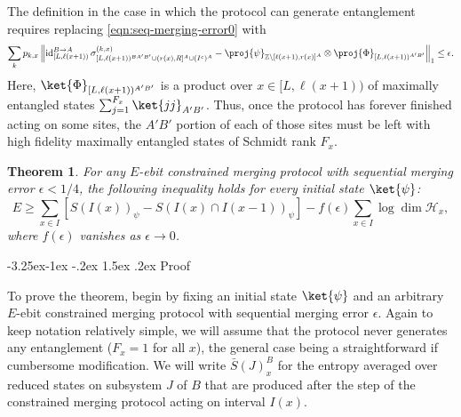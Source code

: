 \documentclass[12pt]{article}
\makeatletter
\newtheorem{theorem}{Theorem}[section]
\renewcommand\subsection{\@startsection{subsection}{2}{\z@}%
                                     {-3.25ex\@plus -1ex \@minus -.2ex}%
                                     {1.5ex \@plus .2ex}%
                                     {\normalfont\bfseries}}
\makeatother
\begin{document}
The definition in the case in which the protocol can generate entanglement requires replacing \eqref{eqn:seq-merging-error0} with
\begin{equation} \label{eqn:seq-merging-error}
\sum_k p_{k,x} \left\|
 \operatorname{id}_{[L,\ell(x+1))}^{B \rightarrow A} \sigma^{(k,x)}_{[L,\ell(x+1))^{BA'B'} \cup (r(x),R]^A \cup (I^c)^A } -  \proj{\psi}_{\mathbb{Z} \setminus [\ell(x+1),r(x)]^A}
 					\otimes \proj{\Phi}_{[L,\ell(x+1))^{A'B'}}
\right\|_1 \leq \epsilon.
\end{equation}
Here, $\ket{\Phi}_{[L,\ell(x+1))^{A'B'}}$ is a product over $x \in [L,\ell(x+1))$ of maximally entangled states $\sum_{j=1}^{F_x} \ket{jj}_{A'B'}$. Thus, once the protocol has forever finished acting on some sites, the $A'B'$ portion of each of those sites must be left with high fidelity maximally entangled states of Schmidt rank $F_x$.
\begin{theorem}
For any $E$-ebit constrained merging protocol with sequential merging error $\epsilon < 1/4$, the following inequality holds for every initial state $\ket{\psi}$:
\begin{equation}
E \geq \sum_{x \in I} \left[ S\left( I(x) \right)_\psi - S\left( I(x) \cap I(x-1) \right)_\psi \right] - f( \epsilon ) \sum_{x \in I} \log \dim \mathcal{H}_x,
\end{equation}
where $f(\epsilon)$ vanishes as $\epsilon \rightarrow 0$.
\end{theorem}

\subsection{Proof}

To prove the theorem, begin by fixing an initial state $\ket{\psi}$ and an arbitrary $E$-ebit constrained merging protocol with sequential merging error $\epsilon$.  Again to keep notation relatively simple, we will assume that the protocol never generates any entanglement ($F_x=1$ for all $x$), the general case being a straightforward if cumbersome modification. We will write $\bar{S}(J)^B_x$ for the entropy averaged over reduced states on subsystem $J$ of $B$ that are produced after the step of the constrained merging protocol acting on interval $I(x)$.
\end{document}
